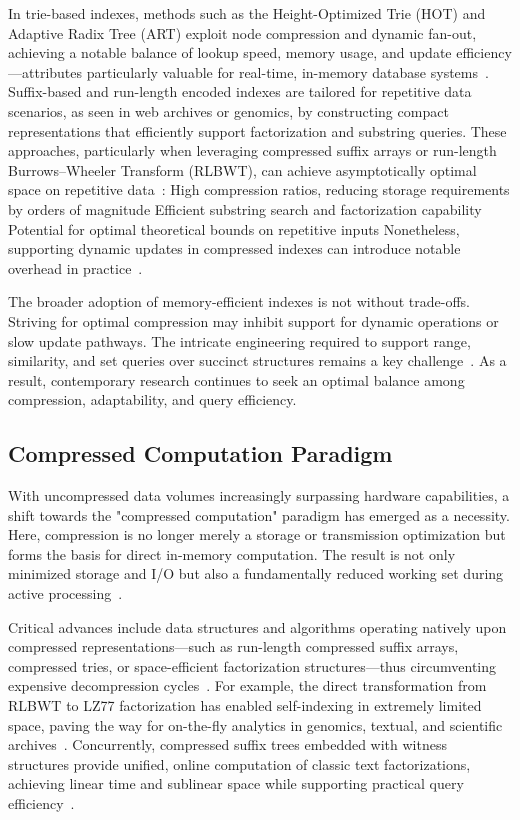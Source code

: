 \documentclass[sigconf]{acmart}
\begin{document}
In trie-based indexes, methods such as the Height-Optimized Trie (HOT) and Adaptive Radix Tree (ART) exploit node compression and dynamic fan-out, achieving a notable balance of lookup speed, memory usage, and update efficiency—attributes particularly valuable for real-time, in-memory database systems~\cite{ref87,ref106,ref109}. Suffix-based and run-length encoded indexes are tailored for repetitive data scenarios, as seen in web archives or genomics, by constructing compact representations that efficiently support factorization and substring queries. These approaches, particularly when leveraging compressed suffix arrays or run-length Burrows–Wheeler Transform (RLBWT), can achieve asymptotically optimal space on repetitive data~\cite{ref108}:
High compression ratios, reducing storage requirements by orders of magnitude
Efficient substring search and factorization capability
Potential for optimal theoretical bounds on repetitive inputs
Nonetheless, supporting dynamic updates in compressed indexes can introduce notable overhead in practice~\cite{ref108,ref118}.

The broader adoption of memory-efficient indexes is not without trade-offs. Striving for optimal compression may inhibit support for dynamic operations or slow update pathways. The intricate engineering required to support range, similarity, and set queries over succinct structures remains a key challenge~\cite{ref109,ref118}. As a result, contemporary research continues to seek an optimal balance among compression, adaptability, and query efficiency.

\subsection{Compressed Computation Paradigm}

With uncompressed data volumes increasingly surpassing hardware capabilities, a shift towards the "compressed computation" paradigm has emerged as a necessity. Here, compression is no longer merely a storage or transmission optimization but forms the basis for direct in-memory computation. The result is not only minimized storage and I/O but also a fundamentally reduced working set during active processing~\cite{ref118}. 

Critical advances include data structures and algorithms operating natively upon compressed representations—such as run-length compressed suffix arrays, compressed tries, or space-efficient factorization structures—thus circumventing expensive decompression cycles~\cite{ref80,ref81,ref82,ref87,ref106,ref108,ref109,ref118}. For example, the direct transformation from RLBWT to LZ77 factorization has enabled self-indexing in extremely limited space, paving the way for on-the-fly analytics in genomics, textual, and scientific archives~\cite{ref108}. Concurrently, compressed suffix trees embedded with witness structures provide unified, online computation of classic text factorizations, achieving linear time and sublinear space while supporting practical query efficiency~\cite{ref109}.
\end{document}
